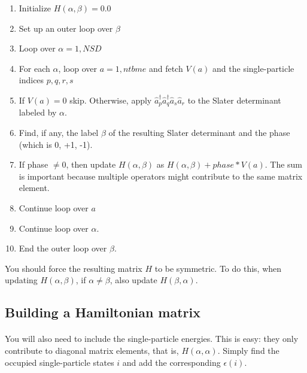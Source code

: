 \documentclass[%
oneside,                 %
final,                   %
10pt]{article}
\begin{document}
\begin{enumerate}
\item Initialize $H(\alpha,\beta)=0.0$

\item Set up an outer loop over $\beta$

\item Loop over $\alpha = 1, NSD$

\item For each $\alpha$, loop over $a=1,ntbme$  and fetch $V(a)$ and the single-particle indices $p,q,r,s$ 

\item If $V(a) = 0$ skip.  Otherwise, apply $\hat{a}^\dagger_p\hat{a}^\dagger_q \hat{a}_s \hat{a}_r$ to the Slater determinant labeled by $\alpha$.

\item Find, if any, the label $\beta$ of the resulting Slater determinant and the phase (which is 0, +1, -1).

\item If phase $\neq 0$, then update $H(\alpha,\beta)$  as $H(\alpha,\beta) + phase*V(a)$. The sum is important because multiple operators might contribute to the same matrix element.

\item Continue loop over $a$

\item Continue loop over $\alpha$.

\item End the outer loop over $\beta$.
\end{enumerate}

\noindent
You should force the resulting matrix $H$ to be symmetric. To do this, when
updating $H(\alpha,\beta)$, if $\alpha \neq \beta$, also update $H(\beta,\alpha)$.



\subsection*{Building a Hamiltonian matrix}

\paragraph{}

You will also need to include the single-particle energies. This is easy: they only
contribute to diagonal matrix elements, that is, $H(\alpha,\alpha)$.  
Simply find the occupied single-particle states $i$ and add the corresponding $\epsilon(i)$.
\end{document}
